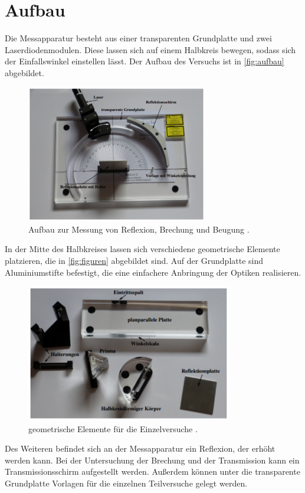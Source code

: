 \section{Aufbau}
\label{sec:Aufbau}

Die Messapparatur besteht aus einer transparenten Grundplatte und zwei Laserdiodenmodulen.
Diese lassen sich auf einem Halbkreis bewegen, sodass sich der Einfallswinkel einstellen
lässt. Der Aufbau des Versuchs ist in \autoref{fig:aufbau} abgebildet. 

\begin{figure}
    \centering
    \includegraphics[height = 6cm]{Aufbau.pdf}
    \caption{Aufbau zur Messung von Reflexion, Brechung und Beugung \cite{ap400}.}
    \label{fig:aufbau}
\end{figure}

In der Mitte des Halbkreises lassen sich verschiedene geometrische Elemente platzieren,
die in \autoref{fig:figuren} abgebildet sind. Auf der Grundplatte sind Aluminiumstifte
befestigt, die eine einfachere Anbringung der Optiken realisieren.

\begin{figure}
    \centering
    \includegraphics[height = 6cm]{Teile.pdf}
    \caption{geometrische Elemente für die Einzelversuche \cite{ap400}.}
    \label{fig:figuren}
\end{figure}

Des Weiteren befindet sich an der Messapparatur ein Reflexion, der erhöht werden kann.
Bei der Untersuchung der Brechung und der Transmission kann ein Transmissionsschirm 
aufgestellt werden. Außerdem können unter die transparente Grundplatte Vorlagen für
die einzelnen Teilversuche gelegt werden.